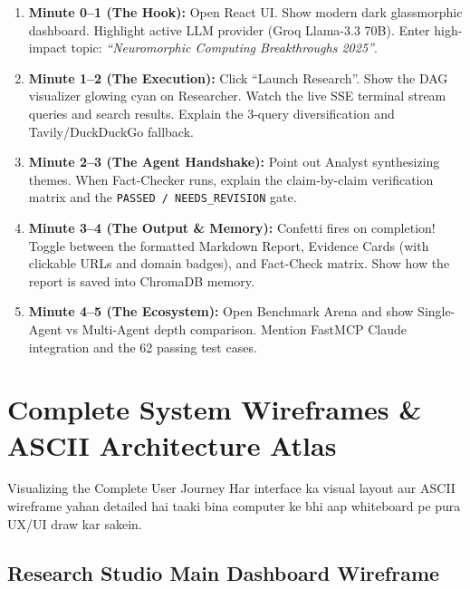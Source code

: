 \documentclass[11pt,a4paper,twoside]{report}
\begin{document}
\begin{enumerate}
    \item \textbf{Minute 0--1 (The Hook):} Open React UI. Show modern dark glassmorphic dashboard. Highlight active LLM provider (Groq Llama-3.3 70B). Enter high-impact topic: \textit{``Neuromorphic Computing Breakthroughs 2025''}.
    \item \textbf{Minute 1--2 (The Execution):} Click ``Launch Research''. Show the DAG visualizer glowing cyan on Researcher. Watch the live SSE terminal stream queries and search results. Explain the 3-query diversification and Tavily/DuckDuckGo fallback.
    \item \textbf{Minute 2--3 (The Agent Handshake):} Point out Analyst synthesizing themes. When Fact-Checker runs, explain the claim-by-claim verification matrix and the \texttt{PASSED / NEEDS\_REVISION} gate.
    \item \textbf{Minute 3--4 (The Output \& Memory):} Confetti fires on completion! Toggle between the formatted Markdown Report, Evidence Cards (with clickable URLs and domain badges), and Fact-Check matrix. Show how the report is saved into ChromaDB memory.
    \item \textbf{Minute 4--5 (The Ecosystem):} Open Benchmark Arena and show Single-Agent vs Multi-Agent depth comparison. Mention FastMCP Claude integration and the 62 passing test cases.
\end{enumerate}




\chapter{Complete System Wireframes \& ASCII Architecture Atlas}

\begin{storybox}{Visualizing the Complete User Journey}
Har interface ka visual layout aur ASCII wireframe yahan detailed hai taaki bina computer ke bhi aap whiteboard pe pura UX/UI draw kar sakein.
\end{storybox}

\section{Research Studio Main Dashboard Wireframe}
\end{document}
